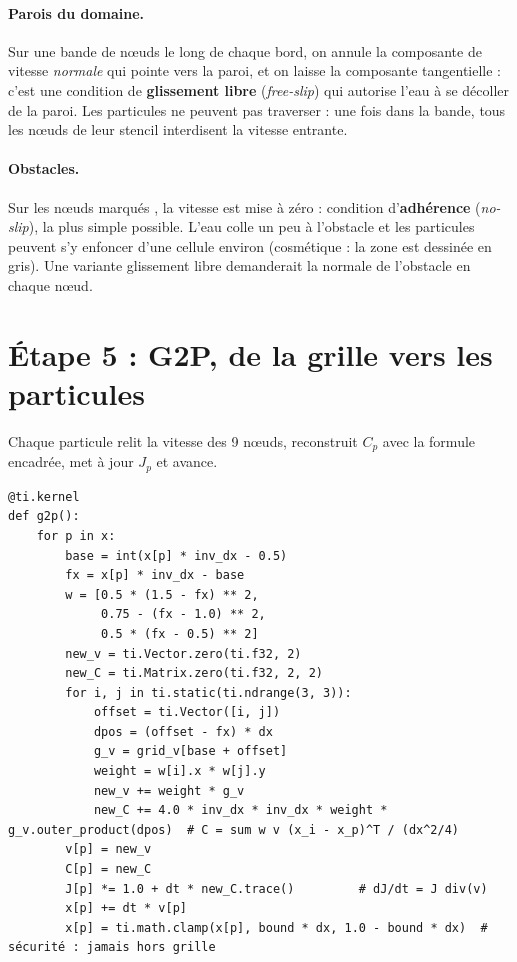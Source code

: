 \documentclass[11pt,a4paper]{article}
\newcommand{\code}[1]{\texttt{\detokenize{#1}}}
\begin{document}
\paragraph{Parois du domaine.} Sur une bande de \code{bound} n\oe uds le long de chaque bord,
on annule la composante de vitesse \emph{normale} qui pointe vers la paroi, et on laisse la
composante tangentielle : c'est une condition de \textbf{glissement libre} (\emph{free-slip})
qui autorise l'eau à se décoller de la paroi. Les particules ne peuvent pas traverser :
une fois dans la bande, tous les n\oe uds de leur stencil interdisent la vitesse entrante.

\paragraph{Obstacles.} Sur les n\oe uds marqués \code{solid}, la vitesse est mise à zéro :
condition d'\textbf{adhérence} (\emph{no-slip}), la plus simple possible. L'eau colle un peu à
l'obstacle et les particules peuvent s'y enfoncer d'une cellule environ (cosmétique : la zone
est dessinée en gris). Une variante glissement libre demanderait la normale de l'obstacle en
chaque n\oe ud.

\section{Étape 5 : G2P, de la grille vers les particules}

Chaque particule relit la vitesse des 9 n\oe uds, reconstruit $C_p$ avec la formule encadrée,
met à jour $J_p$ et avance.

\begin{lstlisting}
@ti.kernel
def g2p():
    for p in x:
        base = int(x[p] * inv_dx - 0.5)
        fx = x[p] * inv_dx - base
        w = [0.5 * (1.5 - fx) ** 2,
             0.75 - (fx - 1.0) ** 2,
             0.5 * (fx - 0.5) ** 2]
        new_v = ti.Vector.zero(ti.f32, 2)
        new_C = ti.Matrix.zero(ti.f32, 2, 2)
        for i, j in ti.static(ti.ndrange(3, 3)):
            offset = ti.Vector([i, j])
            dpos = (offset - fx) * dx
            g_v = grid_v[base + offset]
            weight = w[i].x * w[j].y
            new_v += weight * g_v
            new_C += 4.0 * inv_dx * inv_dx * weight * g_v.outer_product(dpos)  # C = sum w v (x_i - x_p)^T / (dx^2/4)
        v[p] = new_v
        C[p] = new_C
        J[p] *= 1.0 + dt * new_C.trace()         # dJ/dt = J div(v)
        x[p] += dt * v[p]
        x[p] = ti.math.clamp(x[p], bound * dx, 1.0 - bound * dx)  # sécurité : jamais hors grille
\end{lstlisting}
\end{document}
